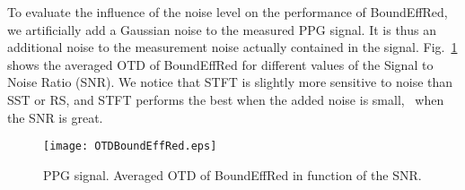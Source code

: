 

To evaluate the influence of the noise level on the performance of {\sf BoundEffRed}, we artificially add a Gaussian noise to the measured PPG signal. It is thus an additional noise to the measurement noise actually contained in the signal. Fig.~\ref{fig:otd.noise} shows the averaged OTD of {\sf BoundEffRed} for different values of the Signal to Noise Ratio (SNR). We notice that STFT is slightly more sensitive to noise than SST or RS, and STFT performs the best when the added noise is small, \ie~when the SNR is great. %


\begin{figure}
\centering
\texttt{[image: OTDBoundEffRed.eps]}
\caption{PPG signal. Averaged OTD of {\sf BoundEffRed} in function of the SNR.}
\label{fig:otd.noise}
\end{figure} 